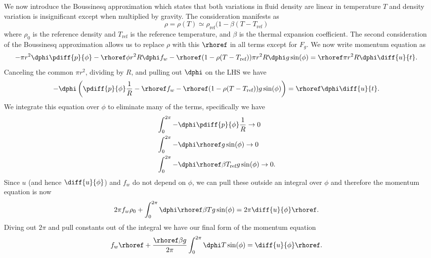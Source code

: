 We now introduce the Boussinesq approximation which states that both variations in fluid density are linear in temperature $T$ and density variation is insignificant except when multiplied by gravity.
The consideration manifests as
\begin{equation*} \rho = \rho (T) \simeq \rho _\text{ref} (1 - \beta (T - T_\text{ref}) \end{equation*}
where $\rho _0$ is the reference density and $T_\text{ref}$ is the reference temperature, and $\beta$ is the thermal expansion coefficient.
The second consideration of the Boussinesq approximation allows us to replace $\rho$ with this $\rhoref$ in all terms except for $F_g$.
We now write momentum equation as
\begin{equation} -\pi r^2 \dphi \pdiff{p}{\phi} - \rhoref \phi r^2 R \dphi f_w
- \rhoref (1 - \rho (T- T_\text{ref}) ) \pi r^2 R \dphi g \sin (\phi) = \rhoref \pi r^2 R \dphi \diff{u}{t}. \end{equation}
Canceling the common $\pi r^2$, dividing by $R$, and pulling out $\dphi$ on the LHS we have
\begin{equation} -\dphi \left ( \pdiff{p}{\phi}  \frac{1}{R} - \rhoref f_w - \rhoref (1 - \rho (T- T_\text{ref}) ) g \sin (\phi) \right ) = \rhoref \dphi \diff{u}{t}. \label{eq:EM07} \end{equation}
We integrate this equation over $\phi$ to eliminate many of the terms, specifically we have
\begin{align*}
& \int _{0} ^{2\pi} -\dphi \pdiff{p}{\phi} \frac{1}{R} \rightarrow 0\\
& \int _{0} ^{2\pi} -\dphi \rhoref g \sin (\phi) \rightarrow 0\\
& \int _{0} ^{2\pi} -\dphi \rhoref \beta T_\text{ref} g \sin (\phi) \rightarrow 0.\end{align*}
Since $u$ (and hence $\diff{u}{\phi}$) and $f_w$ do not depend on $\phi$, we can pull these outside an integral over $\phi$ and therefore the momentum equation is now 
\begin{equation*} 2\pi f_w \rho _0 + \int _{0} ^{2\pi} \dphi \rhoref \beta T g \sin (\phi) = 2\pi \diff{u}{\phi} \rhoref .\end{equation*}
Diving out $2\pi$ and pull constants out of the integral we have our final form of the momentum equation
\begin{equation} f_w \rhoref + \frac{\rhoref \beta g }{2 \pi} \int _{0} ^{2\pi} \dphi T \sin (\phi) = \diff{u}{\phi} \rhoref \label{eq:EM10}.\end{equation}

